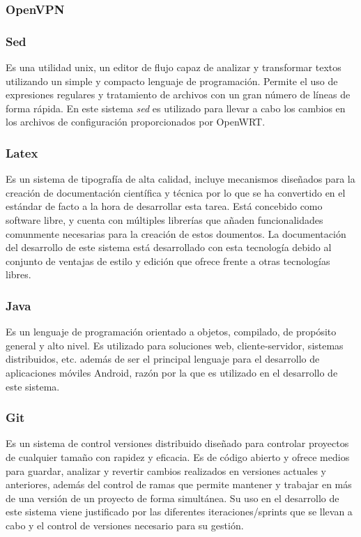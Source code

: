 \documentclass[12pt]{article}
\begin{document}
        \subsubsection{OpenVPN}

        \subsubsection{Sed}
            Es una utilidad unix, un editor de flujo capaz de analizar y transformar textos utilizando un simple y compacto lenguaje de programación. Permite el uso de expresiones regulares y tratamiento de archivos con un gran número de líneas de forma rápida. En este sistema \textit{sed} es utilizado para llevar a cabo los cambios en los archivos de configuración proporcionados por OpenWRT.

        \subsubsection{Latex}
            Es un sistema de tipografía de alta calidad, incluye mecanismos diseñados para la creación de documentación científica y técnica por lo que se ha convertido en el estándar de facto a la hora de desarrollar esta tarea. Está concebido como software libre, y cuenta con múltiples librerías que añaden funcionalidades comunmente necesarias para la creación de estos doumentos. La documentación del desarrollo de este sistema está desarrollado con esta tecnología debido al conjunto de ventajas de estilo y edición que ofrece frente a otras tecnologías libres.

        \subsubsection{Java}
            Es un lenguaje de programación orientado a objetos, compilado, de propósito general y alto nivel. Es utilizado para soluciones web, cliente-servidor, sistemas distribuidos, etc. además de ser el principal lenguaje para el desarrollo de aplicaciones móviles Android, razón por la que es utilizado en el desarrollo de este sistema.

        \subsubsection{Git}
            Es un sistema de control versiones distribuido diseñado para controlar proyectos de cualquier tamaño con rapidez y eficacia. Es de código abierto y ofrece medios para guardar, analizar y revertir cambios realizados en versiones actuales y anteriores, además del control de ramas que permite mantener y trabajar en más de una versión de un proyecto de forma simultánea. Su uso en el desarrollo de este sistema viene justificado por las diferentes iteraciones/sprints que se llevan a cabo y el control de versiones necesario para su gestión.
\end{document}
